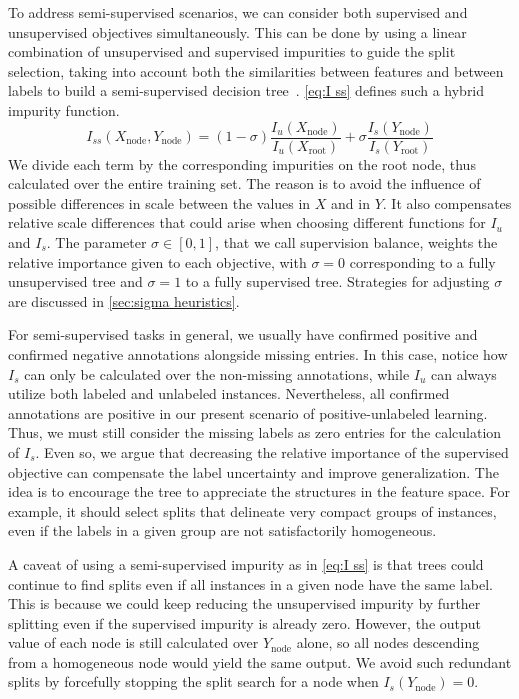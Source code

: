 To address semi-supervised scenarios, we can consider both supervised and unsupervised objectives simultaneously. This can be done by using a linear combination of unsupervised and supervised impurities to guide the split selection, taking into account both the similarities between features and between labels to build a semi-supervised decision tree~\cite{levatic2017semisupervised,adiyeke2022semisupervised,alves2023semisupervised}.
\autoref{eq:I ss} defines such a hybrid impurity function.
%
\begin{equation}
    I_{ss}(X_\text{node}, Y_\text{node}) =
        (1 - \sigma) \frac{I_u(X_\text{node})}{I_u(X_\text{root})}
        + \sigma \frac{I_s(Y_\text{node})}{I_s(Y_\text{root})}
    \label{eq:I ss}
\end{equation}
%
We divide each term by the corresponding impurities on the root node, thus calculated over the entire training set. The reason is to avoid the influence of possible differences in scale between the values in $X$ and in $Y$. It also compensates relative scale differences that could arise when choosing different functions for $I_u$ and $I_s$.
%
The parameter $\sigma \in [0, 1]$, that we call supervision balance,  %
weights the relative importance given to each objective, with $\sigma = 0$ corresponding to a fully unsupervised tree and $\sigma = 1$ to a fully supervised tree. Strategies for adjusting $\sigma$ are discussed in \autoref{sec:sigma heuristics}.

For semi-supervised tasks in general, we usually have confirmed positive and confirmed negative annotations alongside missing entries. In this case, notice how $I_s$ can only be calculated over the non-missing annotations, while $I_u$ can always utilize both labeled and unlabeled instances.
%
Nevertheless, all confirmed annotations are positive in our present scenario of positive-unlabeled learning. Thus, we must still consider the missing labels as zero entries for the calculation of $I_s$. Even so, we argue 
that decreasing the relative importance of the supervised objective can compensate the label uncertainty and improve generalization. The idea is to encourage the tree to appreciate the structures in the feature space. For example, it should select splits that delineate very compact groups of instances, even if the labels in a given group are not satisfactorily homogeneous.

A caveat of using a semi-supervised impurity as in \autoref{eq:I ss} is that trees could continue to find splits even if all instances in a given node have the same label. This is because we could keep reducing the unsupervised impurity by further splitting even if the supervised impurity is already zero.
However, the output value of each node is still calculated over $Y_\text{node}$ alone, so all nodes descending from a homogeneous node would yield the same output. We avoid such redundant splits by forcefully stopping the split search for a node when $I_s(Y_\text{node})=0$.

